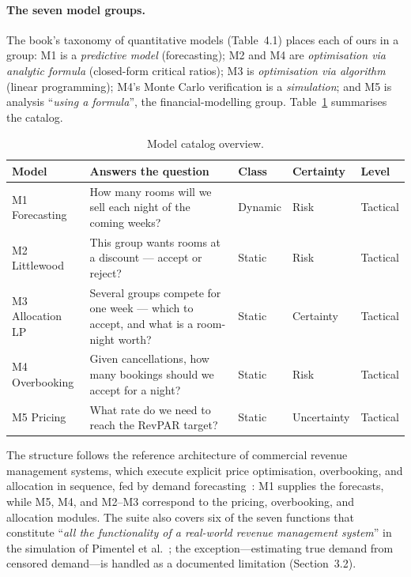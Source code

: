 \paragraph{The seven model groups.}
The book's taxonomy of quantitative models (Table~4.1) places each of ours in a group: M1 is a \emph{predictive model} (forecasting); M2 and M4 are \emph{optimisation via analytic formula} (closed-form critical ratios); M3 is \emph{optimisation via algorithm} (linear programming); M4's Monte Carlo verification is a \emph{simulation}; and M5 is analysis ``\emph{using a formula}'', the financial-modelling group. Table~\ref{tab:modelcatalog} summarises the catalog.

\begin{table}[H]
\centering
\caption{Model catalog overview.}
\label{tab:modelcatalog}
\begin{tabularx}{\textwidth}{@{}l X l l l@{}}
\toprule
\textbf{Model} & \textbf{Answers the question} & \textbf{Class} & \textbf{Certainty} & \textbf{Level} \\
\midrule
M1 Forecasting & How many rooms will we sell each night of the coming weeks? & Dynamic & Risk & Tactical \\
M2 Littlewood & This group wants rooms at a discount --- accept or reject? & Static & Risk & Tactical \\
M3 Allocation LP & Several groups compete for one week --- which to accept, and what is a room-night worth? & Static & Certainty & Tactical \\
M4 Overbooking & Given cancellations, how many bookings should we accept for a night? & Static & Risk & Tactical \\
M5 Pricing & What rate do we need to reach the RevPAR target? & Static & Uncertainty & Tactical \\
\bottomrule
\end{tabularx}
\end{table}

The structure follows the reference architecture of commercial revenue management systems, which execute explicit price optimisation, overbooking, and allocation in sequence, fed by demand forecasting~\cite{pimentel2019}: M1 supplies the forecasts, while M5, M4, and M2--M3 correspond to the pricing, overbooking, and allocation modules.
The suite also covers six of the seven functions that constitute ``\emph{all the functionality of a real-world revenue management system}'' in the simulation of Pimentel et al.~\cite{pimentel2019}; the exception---estimating true demand from censored demand---is handled as a documented limitation (Section~3.2).

